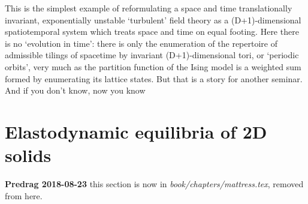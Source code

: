 \begin{description}
      This is the simplest example of reformulating a space and time translationally invariant, exponentially unstable `turbulent' field theory as a (D+1)-dimensional spatiotemporal system which treats space and time on equal footing. Here there is no `evolution in time': there is only the enumeration of the repertoire of admissible tilings of spacetime by invariant (D+1)-dimensional tori, or `periodic orbits', very much as the partition function of the Ising model is a weighted sum formed by enumerating its lattice states. But that is a story for another seminar.
\\

 And if you don't know,
 {now you know}


\end{description}




\newpage %

\newpage %


\newpage %


\newpage %


\newpage %


\section{Elastodynamic equilibria of 2D solids}
\label{sect:2Dsolids}

{\bf Predrag 2018-08-23} this section is now in {\em book/chapters/mattress.tex},
 removed from here.

\newpage %



\printbibliography[heading=subbibintoc,title={References}]

\ChapterEnd %
